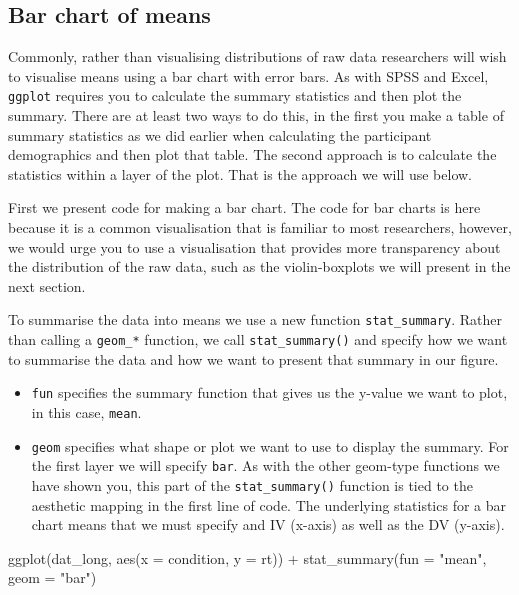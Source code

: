 \documentclass[
  english,
  doc,floatsintext]{apa6}
\newenvironment{Shaded}{\begin{snugshade}}{\end{snugshade}}
\newcommand{\AttributeTok}[1]{\textcolor[rgb]{0.77,0.63,0.00}{#1}}
\newcommand{\FunctionTok}[1]{\textcolor[rgb]{0.00,0.00,0.00}{#1}}
\newcommand{\NormalTok}[1]{#1}
\newcommand{\SpecialCharTok}[1]{\textcolor[rgb]{0.00,0.00,0.00}{#1}}
\newcommand{\StringTok}[1]{\textcolor[rgb]{0.31,0.60,0.02}{#1}}
\begin{document}
\hypertarget{bar-chart-of-means}{%
\subsection{Bar chart of means}\label{bar-chart-of-means}}

Commonly, rather than visualising distributions of raw data researchers will wish to visualise means using a bar chart with error bars. As with SPSS and Excel, \texttt{ggplot} requires you to calculate the summary statistics and then plot the summary. There are at least two ways to do this, in the first you make a table of summary statistics as we did earlier when calculating the participant demographics and then plot that table. The second approach is to calculate the statistics within a layer of the plot. That is the approach we will use below.

First we present code for making a bar chart. The code for bar charts is here because it is a common visualisation that is familiar to most researchers, however, we would urge you to use a visualisation that provides more transparency about the distribution of the raw data, such as the violin-boxplots we will present in the next section.

To summarise the data into means we use a new function \texttt{stat\_summary}. Rather than calling a \texttt{geom\_*} function, we call \texttt{stat\_summary()} and specify how we want to summarise the data and how we want to present that summary in our figure.

\begin{itemize}
\item
  \texttt{fun} specifies the summary function that gives us the y-value we want to plot, in this case, \texttt{mean}.
\item
  \texttt{geom} specifies what shape or plot we want to use to display the summary. For the first layer we will specify \texttt{bar}. As with the other geom-type functions we have shown you, this part of the \texttt{stat\_summary()} function is tied to the aesthetic mapping in the first line of code. The underlying statistics for a bar chart means that we must specify and IV (x-axis) as well as the DV (y-axis).
\end{itemize}

\begin{Shaded}
\begin{Highlighting}[]
\FunctionTok{ggplot}\NormalTok{(dat\_long, }\FunctionTok{aes}\NormalTok{(}\AttributeTok{x =}\NormalTok{ condition, }\AttributeTok{y =}\NormalTok{ rt)) }\SpecialCharTok{+}
  \FunctionTok{stat\_summary}\NormalTok{(}\AttributeTok{fun =} \StringTok{"mean"}\NormalTok{, }\AttributeTok{geom =} \StringTok{"bar"}\NormalTok{)}
\end{Highlighting}
\end{Shaded}
\end{document}
